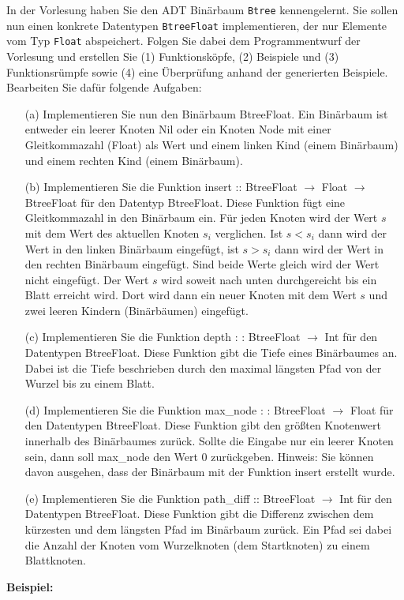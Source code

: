 In der Vorlesung haben Sie den ADT Binärbaum \texttt{Btree} kennengelernt. Sie sollen nun einen konkrete Datentypen \texttt{BtreeFloat} implementieren, der nur Elemente vom Typ \texttt{Float} abspeichert. Folgen Sie dabei dem Programmentwurf der Vorlesung und erstellen Sie (1) Funktionsköpfe, (2) Beispiele und (3) Funktionsrümpfe sowie (4) eine Überprüfung anhand der generierten Beispiele. Bearbeiten Sie dafür folgende Aufgaben:
\begin{itemize}
\item[(a)] Implementieren Sie nun den Binärbaum BtreeFloat. Ein Binärbaum ist entweder ein leerer Knoten Nil oder ein Knoten Node mit einer Gleitkommazahl (Float) als Wert und einem linken Kind (einem Binärbaum) und einem rechten Kind (einem Binärbaum).

\item[(b)] Implementieren Sie die Funktion insert :: BtreeFloat $\rightarrow$ Float $\rightarrow$ BtreeFloat für den Datentyp BtreeFloat. Diese Funktion fügt eine Gleitkommazahl in den Binärbaum ein. Für jeden Knoten wird der Wert $s$ mit dem Wert des aktuellen Knoten $s_{i}$ verglichen. Ist $s<s_{i}$ dann wird der Wert in den linken Binärbaum eingefügt, ist $s>s_{i}$ dann wird der Wert in den rechten Binärbaum eingefügt. Sind beide Werte gleich wird der Wert nicht eingefügt. Der Wert $s$ wird soweit nach unten durchgereicht bis ein Blatt erreicht wird. Dort wird dann ein neuer Knoten mit dem Wert $s$ und zwei leeren Kindern (Binärbäumen) eingefügt.

\item[(c)] Implementieren Sie die Funktion depth : : BtreeFloat $\rightarrow$ Int für den Datentypen BtreeFloat. Diese Funktion gibt die Tiefe eines Binärbaumes an. Dabei ist die Tiefe beschrieben durch den maximal längsten Pfad von der Wurzel bis zu einem Blatt.

\item[(d)] Implementieren Sie die Funktion max\_node : : BtreeFloat $\rightarrow$ Float für den Datentypen BtreeFloat. Diese Funktion gibt den größten Knotenwert innerhalb des Binärbaumes zurück. Sollte die Eingabe nur ein leerer Knoten sein, dann soll max\_node den Wert 0 zurückgeben. Hinweis: Sie können davon ausgehen, dass der Binärbaum mit der Funktion insert erstellt wurde.

\item[(e)] Implementieren Sie die Funktion path\_diff :: BtreeFloat $\rightarrow$ Int für den Datentypen BtreeFloat. Diese Funktion gibt die Differenz zwischen dem kürzesten und dem längsten Pfad im Binärbaum zurück. Ein Pfad sei dabei die Anzahl der Knoten vom Wurzelknoten (dem Startknoten) zu einem Blattknoten.
\end{itemize}
\textbf{Beispiel:}


